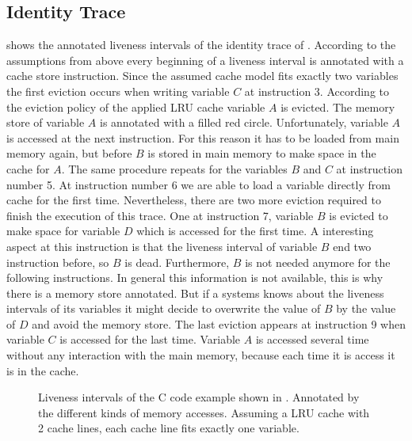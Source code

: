 \documentclass[onecolumn, openright, master, english, signatures]{dbrgrptt}
\begin{document}
\subsection{Identity Trace}
 shows the annotated liveness intervals of the identity \ac{trace} of . According to the assumptions from above every beginning of a liveness interval is annotated with a cache store instruction. Since the assumed cache model fits exactly two variables the first eviction occurs when writing variable $C$ at instruction 3. According to the eviction policy of the applied \ac{LRU} cache variable $A$ is evicted. The memory store of variable $A$ is annotated with a filled red circle. Unfortunately, variable $A$ is accessed at the next instruction. For this reason it has to be loaded from main memory again, but before $B$ is stored in main memory to make space in the cache for $A$. The same procedure repeats for the variables $B$ and $C$ at instruction number 5. At instruction number 6 we are able to load a variable directly from cache for the first time. Nevertheless, there are two more eviction required to finish the execution of this trace. One at instruction 7, variable $B$ is evicted to make space for variable $D$ which is accessed for the first time. A interesting aspect at this instruction is that the liveness interval of variable $B$ end two instruction before, so $B$ is dead. Furthermore, $B$ is not needed anymore for the following instructions. In general this information is not available, this is why there is a memory store annotated. But if a systems knows about the liveness intervals of its variables it might decide to overwrite the value of $B$ by the value of $D$ and avoid the memory store. The last eviction appears at instruction 9 when variable $C$ is accessed for the last time. Variable $A$ is accessed several time without any interaction with the main memory, because each time it is access it is in the cache.

\begin{figure}[!ht]
  \centering
  
  \caption{Liveness intervals of the C code example shown in . Annotated by the different kinds of memory accesses. Assuming a LRU cache with 2 cache lines, each cache line fits exactly one variable.}
  \label{fig:trace-transformation-original-marked}
\end{figure}
\end{document}
